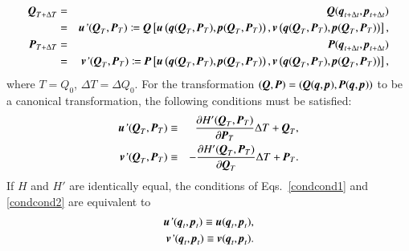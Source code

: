 \documentclass[preprint,
bibnotes,
 amsmath,amssymb,
 aps,
]{revtex4-1}
\newcounter{num}
\begin{document}
\begin{eqnarray}
    {\textit{\textbf{Q}}}_{T+\Delta T} &=& {\textit{\textbf{Q}}}(\textit{\textbf{q}}_{t+\Delta t},\textit{\textbf{p}}_{t+\Delta t})\nonumber\\
    \label{canf1}
    &=& \textit{\textbf{u}'}(\textit{\textbf{Q}}_{T},\textit{\textbf{P}}_{T}) \coloneqq {\textit{\textbf{Q}}}\left[\textit{\textbf{u}}\left(\textit{\textbf{q}}(\textit{\textbf{Q}}_{T},\textit{\textbf{P}}_{T}),\textit{\textbf{p}}(\textit{\textbf{Q}}_{T},\textit{\textbf{P}}_{T})\right),\textit{\textbf{v}}\left(\textit{\textbf{q}}(\textit{\textbf{Q}}_{T},\textit{\textbf{P}}_{T}),\textit{\textbf{p}}(\textit{\textbf{Q}}_{T},\textit{\textbf{P}}_{T})\right)\right],\\
    {\textit{\textbf{P}}}_{T+\Delta T} &=& {\textit{\textbf{P}}}(\textit{\textbf{q}}_{t+\Delta t},\textit{\textbf{p}}_{t+\Delta t})\nonumber\\
    \label{canf2}
    &=& \textit{\textbf{v}'}(\textit{\textbf{Q}}_{T},\textit{\textbf{P}}_{T}) \coloneqq 
    {\textit{\textbf{P}}}\left[\textit{\textbf{u}}\left(\textit{\textbf{q}}(\textit{\textbf{Q}}_{T},\textit{\textbf{P}}_{T}),\textit{\textbf{p}}(\textit{\textbf{Q}}_{T},\textit{\textbf{P}}_{T})\right),\textit{\textbf{v}}\left(\textit{\textbf{q}}(\textit{\textbf{Q}}_{T},\textit{\textbf{P}}_{T}),\textit{\textbf{p}}(\textit{\textbf{Q}}_{T},\textit{\textbf{P}}_{T})\right)\right],
\end{eqnarray}
where $T = Q_0$, $\Delta T = \Delta Q_0$. For the transformation $(\textit{\textbf{Q}},\textit{\textbf{P}}) = \left(\textit{\textbf{Q}}(\textit{\textbf{q}},\textit{\textbf{p}}),\textit{\textbf{P}}(\textit{\textbf{q}},\textit{\textbf{p}})\right)$ to be a canonical transformation, the following conditions must be satisfied:
\begin{eqnarray}
\label{condcond1}
 \textit{\textbf{u}'}(\textit{\textbf{Q}}_{T},\textit{\textbf{P}}_{T}) &\equiv&  \frac{\partial{H'(\textit{\textbf{Q}}_{T},\textit{\textbf{P}}_{T})}}{\partial{\textit{\textbf{P}}}_{T}}\Delta T + {\textit{\textbf{Q}}}_{T},\\
\label{condcond2}
 \textit{\textbf{v}'}(\textit{\textbf{Q}}_{T},\textit{\textbf{P}}_{T}) &\equiv& 
 -\frac{\partial{H'(\textit{\textbf{Q}}_{T},\textit{\textbf{P}}_{T})}}{\partial{\textit{\textbf{Q}}}_{T}}\Delta T + {\textit{\textbf{P}}}_{T}.
\end{eqnarray}
If $H$ and $H'$ are identically equal, the conditions of Eqs.~\eqref{condcond1} and \eqref{condcond2} are equivalent to 
\begin{equation}
\begin{split}
\label{proof_motion1}
 \textit{\textbf{u}'}(\textit{\textbf{q}}_{t},\textit{\textbf{p}}_{t}) \equiv  \textit{\textbf{u}}(\textit{\textbf{q}}_{t},\textit{\textbf{p}}_{t}),\\
 \textit{\textbf{v}'}(\textit{\textbf{q}}_{t},\textit{\textbf{p}}_{t}) \equiv 
 \textit{\textbf{v}}(\textit{\textbf{q}}_{t},\textit{\textbf{p}}_{t}).
\end{split}
\end{equation}
\end{document}
